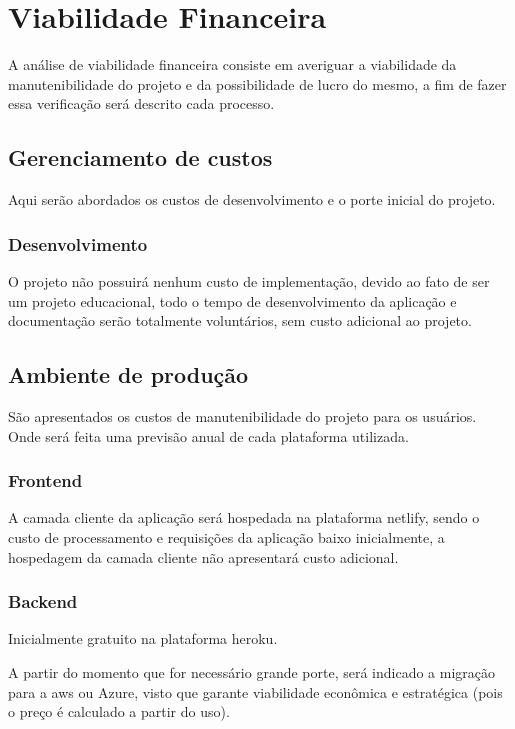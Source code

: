 \section{Viabilidade Financeira}
A análise de viabilidade financeira consiste em averiguar a viabilidade da manutenibilidade do projeto
e da possibilidade de lucro do mesmo, a fim de fazer essa verificação será descrito cada processo.

\subsection{Gerenciamento de custos}
Aqui serão abordados os custos de desenvolvimento e o porte inicial do projeto.

\subsubsection{Desenvolvimento}
O projeto não possuirá nenhum custo de implementação, devido ao fato de ser um projeto educacional,
todo o tempo de desenvolvimento da aplicação e documentação serão totalmente voluntários, sem custo adicional ao projeto.

\subsection{Ambiente de produção}
São apresentados os custos de manutenibilidade do projeto para os usuários. 
Onde será feita uma previsão anual de cada plataforma utilizada.

\subsubsection{Frontend}
A camada cliente da aplicação será hospedada na plataforma \gls{netlify}, sendo o custo de processamento e requisições da aplicação
baixo inicialmente, a hospedagem da camada cliente não apresentará custo adicional.

\subsubsection{Backend}
Inicialmente gratuito na plataforma \gls{heroku}.

A partir do momento que for necessário grande porte, será indicado a migração para a \gls{aws} ou Azure,
visto que garante viabilidade econômica e estratégica (pois o
preço é calculado a partir do uso).

